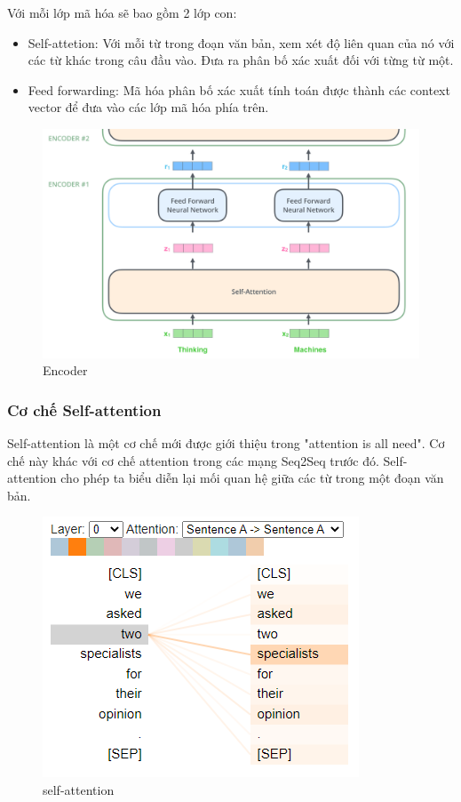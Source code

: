 Với mỗi lớp mã hóa sẽ bao gồm 2 lớp con:
\begin{itemize}
	\item Self-attetion: Với mỗi từ trong đoạn văn bản, xem xét độ liên quan của nó với các từ khác trong câu đầu vào. Đưa ra phân bố xác xuất đối với từng từ một.
	\item Feed forwarding: Mã hóa phân bố xác xuất tính toán được thành các context vector để đưa vào các lớp mã hóa phía trên.
\end{itemize}

\begin{figure}[H]
    \begin{center}
        \includegraphics[scale=0.35]{images/encoder}
        \caption{Encoder}
        \label{fig:encoder}
    \end{center}
\end{figure}


\subsubsection{Cơ chế Self-attention}

Self-attention là một cơ chế mới được giới thiệu trong "attention is all need". Cơ chế này khác với cơ chế attention trong các mạng Seq2Seq trước đó. Self-attention cho phép ta biểu diễn lại mối quan hệ giữa các từ trong một đoạn văn bản.

\begin{figure}[H]
    \begin{center}
        \includegraphics[scale=1.0]{images/self-attention}
        \caption{self-attention}
        \label{fig:self-attention}
    \end{center}
\end{figure}

